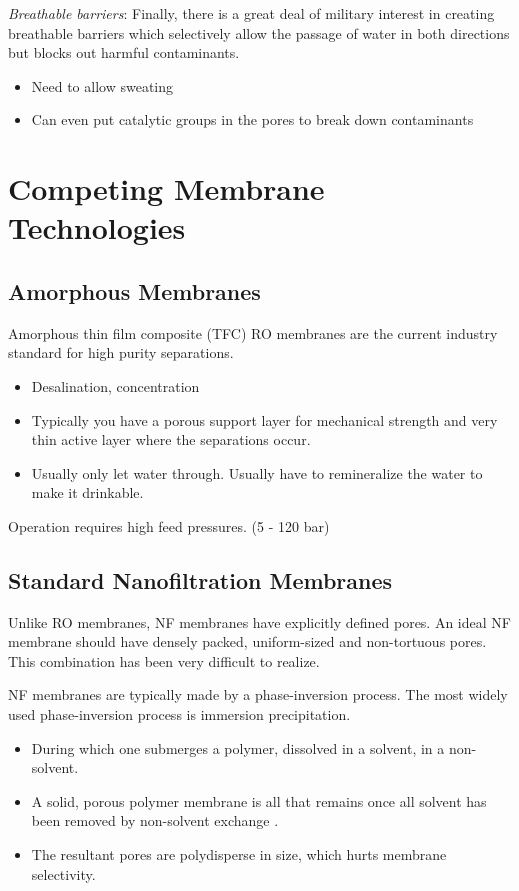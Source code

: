   \textit{Breathable barriers}:
  Finally, there is a great deal of military interest in creating breathable 
  barriers which selectively allow the passage of water in both directions but
  blocks out harmful contaminants.
  \begin{itemize}
    \item Need to allow sweating
    \item Can even put catalytic groups in the pores to break down contaminants
  \end{itemize}

  \section{Competing Membrane Technologies}

  \subsection{Amorphous Membranes}
  
  Amorphous thin film composite (TFC) RO membranes are the current industry standard for
  high purity separations.
  \begin{itemize}  
    \item Desalination, concentration
    \item Typically you have a porous support layer for mechanical strength and 
    very thin active layer where the separations occur.
    \item Usually only let water through. Usually have to remineralize the
    water to make it drinkable.
  \end{itemize}
  
  Operation requires high feed pressures. (5 - 120 bar) ~\cite{van_der_bruggen_review_2003}
  
  \subsection{Standard Nanofiltration Membranes}

  Unlike RO membranes, NF membranes have explicitly defined pores. An
  ideal NF membrane should have densely packed, uniform-sized and
  non-tortuous pores. This combination has been very difficult to realize.
  
  NF membranes are typically made by a phase-inversion process. The most 
  widely used phase-inversion process is immersion precipitation.
  \begin{itemize}
    \item During which one submerges a polymer, dissolved in a solvent, in
    a non-solvent.
    \item A solid, porous polymer membrane is all that remains once all
    solvent has been removed by non-solvent exchange \cite{smolders_microstructures_1992}.
    \item The resultant pores are polydisperse in size, which hurts membrane selectivity. 
  \end{itemize}    
    
